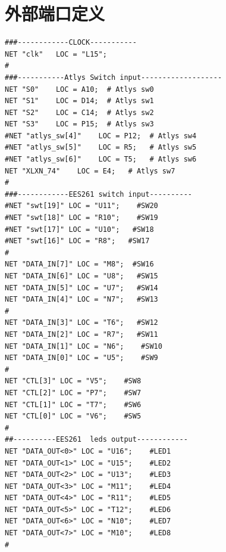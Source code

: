 \documentclass[a4paper]{ctexart}
\begin{document}
\section{外部端口定义}\label{外部端口定义}
\begin{lstlisting}
###------------CLOCK-----------
NET "clk"   LOC = "L15";
#
###-----------Atlys Switch input-------------------
NET "S0"    LOC = A10;  # Atlys sw0
NET "S1"    LOC = D14;  # Atlys sw1
NET "S2"    LOC = C14;  # Atlys sw2
NET "S3"    LOC = P15;  # Atlys sw3
#NET "atlys_sw[4]"    LOC = P12;  # Atlys sw4
#NET "atlys_sw[5]"    LOC = R5;   # Atlys sw5
#NET "atlys_sw[6]"    LOC = T5;   # Atlys sw6
NET "XLXN_74"    LOC = E4;   # Atlys sw7
#
###------------EES261 switch input----------
#NET "swt[19]" LOC = "U11";    #SW20
#NET "swt[18]" LOC = "R10";    #SW19
#NET "swt[17]" LOC = "U10";   #SW18
#NET "swt[16]" LOC = "R8";   #SW17
#
NET "DATA_IN[7]" LOC = "M8";  #SW16
NET "DATA_IN[6]" LOC = "U8";   #SW15
NET "DATA_IN[5]" LOC = "U7";   #SW14
NET "DATA_IN[4]" LOC = "N7";   #SW13
#
NET "DATA_IN[3]" LOC = "T6";   #SW12
NET "DATA_IN[2]" LOC = "R7";   #SW11
NET "DATA_IN[1]" LOC = "N6";    #SW10
NET "DATA_IN[0]" LOC = "U5";    #SW9
#
NET "CTL[3]" LOC = "V5";    #SW8
NET "CTL[2]" LOC = "P7";    #SW7
NET "CTL[1]" LOC = "T7";    #SW6
NET "CTL[0]" LOC = "V6";    #SW5
#
##----------EES261  leds output------------
NET "DATA_OUT<0>" LOC = "U16";    #LED1
NET "DATA_OUT<1>" LOC = "U15";    #LED2
NET "DATA_OUT<2>" LOC = "U13";    #LED3
NET "DATA_OUT<3>" LOC = "M11";    #LED4
NET "DATA_OUT<4>" LOC = "R11";    #LED5
NET "DATA_OUT<5>" LOC = "T12";    #LED6
NET "DATA_OUT<6>" LOC = "N10";    #LED7
NET "DATA_OUT<7>" LOC = "M10";    #LED8
#
\end{lstlisting}
\end{document}
